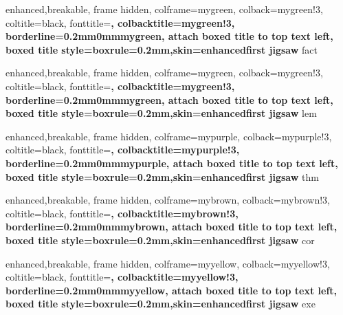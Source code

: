 {
	enhanced,breakable,
	frame hidden,
	colframe=mygreen,
	colback=mygreen!3,
	coltitle=black,
	fonttitle=\bfseries,
	colbacktitle=mygreen!3,
	borderline={0.2mm}{0mm}{mygreen},
	attach boxed title to top text left,
	boxed title style={boxrule=0.2mm,skin=enhancedfirst jigsaw}
}
{fact}

{
	enhanced,breakable,
	frame hidden,
	colframe=mygreen,
	colback=mygreen!3,
	coltitle=black,
	fonttitle=\bfseries,
	colbacktitle=mygreen!3,
	borderline={0.2mm}{0mm}{mygreen},
	attach boxed title to top text left,
	boxed title style={boxrule=0.2mm,skin=enhancedfirst jigsaw}
}
{lem}

{
	enhanced,breakable,
	frame hidden,
	colframe=mypurple,
	colback=mypurple!3,
	coltitle=black,
	fonttitle=\bfseries,
	colbacktitle=mypurple!3,
	borderline={0.2mm}{0mm}{mypurple},
	attach boxed title to top text left,
	boxed title style={boxrule=0.2mm,skin=enhancedfirst jigsaw}
}
{thm}

{
	enhanced,breakable,
	frame hidden,
	colframe=mybrown,
	colback=mybrown!3,
	coltitle=black,
	fonttitle=\bfseries,
	colbacktitle=mybrown!3,
	borderline={0.2mm}{0mm}{mybrown},
	attach boxed title to top text left,
	boxed title style={boxrule=0.2mm,skin=enhancedfirst jigsaw}
}
{cor}

{
	enhanced,breakable,
	frame hidden,
	colframe=myyellow,
	colback=myyellow!3,
	coltitle=black,
	fonttitle=\bfseries,
	colbacktitle=myyellow!3,
	borderline={0.2mm}{0mm}{myyellow},
	attach boxed title to top text left,
	boxed title style={boxrule=0.2mm,skin=enhancedfirst jigsaw}
}
{exe}

\def\R{\mathbb R}
\def\Cb{\mathbb C}
\def\N{\mathbb N}
\def\Z{\mathbb Z}
\def\Q{\mathbb Q}
\def\E{\mathbb E}

\def\mor{\mathrm {Mor}}
\def\ob{\mathrm {Ob}}

\def\P{\mathfrak{P}}

\def\M{\mathcal{M}}
\def\C{\mathcal{C}}
\def\H{\mathcal{H}}
\def\A{\mathcal{A}}
\def\B{\mathcal{B}}

\def\gen{{\mathcal{M}_\mathrm{gen}}}
\def\inj{{\mathcal{M}_\mathrm{inj}}}
\def\iso{{\mathcal{M}_\mathrm{iso}}}

\def\Cf{\mathfrak{C}}
\def\Rf{\mathfrak{R}}
\def\Jf{\mathfrak{J}}
\def\Ff{\mathfrak{F}}
\def\Hf{\mathfrak{H}}
\def\Tf{\mathfrak{T}}

\def\id{\mathrm{id}}

\def\refines{\preceq_\mathrm{ref}}

\def\eg{\emph{e.g.}}
\def\Eg{\emph{E.g.}}
\def\ie{\emph{i.e.}}
\def\Ie{\emph{I.e.}}
\def\etc{\emph{etc.}}
\def\st{\text{s.t.}}

\def\apriori{\emph{a priori}}
\def\Apriori{\emph{A priori}}

\def\sep{\mathrm{sep}}
\def\diam{\mathrm{diam}}

\DeclareMathOperator*{\argmin}{argmin}
\DeclareMathOperator*{\argmax}{argmax}
\DeclareMathOperator*{\image}{im}
\DeclareMathOperator*{\kernel}{ker}